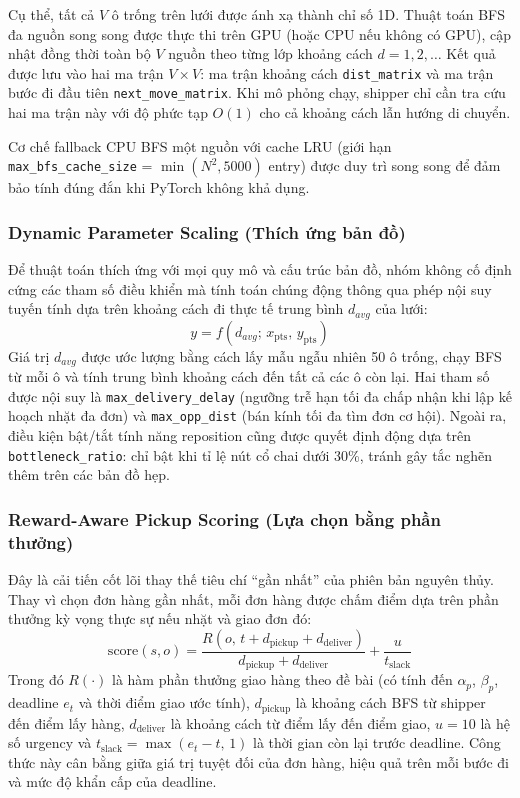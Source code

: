 \documentclass[conference]{IEEEtran}
\begin{document}
Cụ thể, tất cả $V$ ô trống trên lưới được ánh xạ thành chỉ số 1D. Thuật toán BFS đa nguồn song song được thực thi trên GPU (hoặc CPU nếu không có GPU), cập nhật đồng thời toàn bộ $V$ nguồn theo từng lớp khoảng cách $d = 1, 2, \ldots$ Kết quả được lưu vào hai ma trận $V \times V$: ma trận khoảng cách \texttt{dist\_matrix} và ma trận bước đi đầu tiên \texttt{next\_move\_matrix}. Khi mô phỏng chạy, shipper chỉ cần tra cứu hai ma trận này với độ phức tạp $O(1)$ cho cả khoảng cách lẫn hướng di chuyển.
 
Cơ chế fallback CPU BFS một nguồn với cache LRU (giới hạn \texttt{max\_bfs\_cache\_size} = $\min(N^2, 5000)$ entry) được duy trì song song để đảm bảo tính đúng đắn khi PyTorch không khả dụng.
 
\subsubsection{Dynamic Parameter Scaling (Thích ứng bản đồ)}
Để thuật toán thích ứng với mọi quy mô và cấu trúc bản đồ, nhóm không cố định cứng các tham số điều khiển mà tính toán chúng động thông qua phép nội suy tuyến tính dựa trên khoảng cách đi thực tế trung bình $d_{avg}$ của lưới:
\begin{equation}
y = f(d_{avg};\, x_{\text{pts}},\, y_{\text{pts}})
\end{equation}
Giá trị $d_{avg}$ được ước lượng bằng cách lấy mẫu ngẫu nhiên 50 ô trống, chạy BFS từ mỗi ô và tính trung bình khoảng cách đến tất cả các ô còn lại. Hai tham số được nội suy là \texttt{max\_delivery\_delay} (ngưỡng trễ hạn tối đa chấp nhận khi lập kế hoạch nhặt đa đơn) và \texttt{max\_opp\_dist} (bán kính tối đa tìm đơn cơ hội). Ngoài ra, điều kiện bật/tắt tính năng reposition cũng được quyết định động dựa trên \texttt{bottleneck\_ratio}: chỉ bật khi tỉ lệ nút cổ chai dưới 30\%, tránh gây tắc nghẽn thêm trên các bản đồ hẹp.
 
\subsubsection{Reward-Aware Pickup Scoring (Lựa chọn bằng phần thưởng)}
Đây là cải tiến cốt lõi thay thế tiêu chí ``gần nhất'' của phiên bản nguyên thủy. Thay vì chọn đơn hàng gần nhất, mỗi đơn hàng được chấm điểm dựa trên phần thưởng kỳ vọng thực sự nếu nhặt và giao đơn đó:
\begin{equation}
\text{score}(s, o) = \frac{R(o,\, t + d_{\text{pickup}} + d_{\text{deliver}})}{d_{\text{pickup}} + d_{\text{deliver}}} + \frac{u}{t_{\text{slack}}}
\end{equation}
Trong đó $R(\cdot)$ là hàm phần thưởng giao hàng theo đề bài (có tính đến $\alpha_p$, $\beta_p$, deadline $e_t$ và thời điểm giao ước tính), $d_{\text{pickup}}$ là khoảng cách BFS từ shipper đến điểm lấy hàng, $d_{\text{deliver}}$ là khoảng cách từ điểm lấy đến điểm giao, $u = 10$ là hệ số urgency và $t_{\text{slack}} = \max(e_t - t,\, 1)$ là thời gian còn lại trước deadline. Công thức này cân bằng giữa giá trị tuyệt đối của đơn hàng, hiệu quả trên mỗi bước đi và mức độ khẩn cấp của deadline.
 
\end{document}
